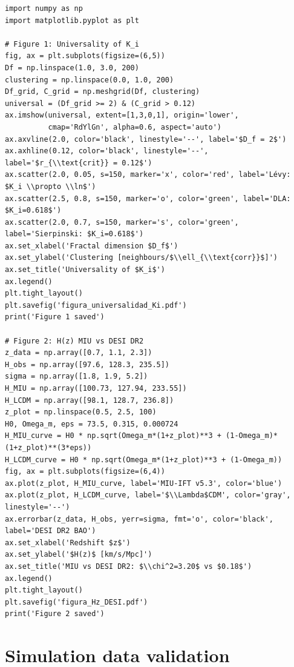 \documentclass[12pt, a4paper]{article}
\theoremstyle{miuThm}
\theoremstyle{remark}
\begin{document}
\begin{verbatim}
import numpy as np
import matplotlib.pyplot as plt

# Figure 1: Universality of K_i
fig, ax = plt.subplots(figsize=(6,5))
Df = np.linspace(1.0, 3.0, 200)
clustering = np.linspace(0.0, 1.0, 200)
Df_grid, C_grid = np.meshgrid(Df, clustering)
universal = (Df_grid >= 2) & (C_grid > 0.12)
ax.imshow(universal, extent=[1,3,0,1], origin='lower',
          cmap='RdYlGn', alpha=0.6, aspect='auto')
ax.axvline(2.0, color='black', linestyle='--', label='$D_f = 2$')
ax.axhline(0.12, color='black', linestyle='--', label='$r_{\\text{crit}} = 0.12$')
ax.scatter(2.0, 0.05, s=150, marker='x', color='red', label='Lévy: $K_i \\propto \\ln$')
ax.scatter(2.5, 0.8, s=150, marker='o', color='green', label='DLA: $K_i=0.618$')
ax.scatter(2.0, 0.7, s=150, marker='s', color='green', label='Sierpinski: $K_i=0.618$')
ax.set_xlabel('Fractal dimension $D_f$')
ax.set_ylabel('Clustering [neighbours/$\\ell_{\\text{corr}}$]')
ax.set_title('Universality of $K_i$')
ax.legend()
plt.tight_layout()
plt.savefig('figura_universalidad_Ki.pdf')
print('Figure 1 saved')

# Figure 2: H(z) MIU vs DESI DR2
z_data = np.array([0.7, 1.1, 2.3])
H_obs = np.array([97.6, 128.3, 235.5])
sigma = np.array([1.8, 1.9, 5.2])
H_MIU = np.array([100.73, 127.94, 233.55])
H_LCDM = np.array([98.1, 128.7, 236.8])
z_plot = np.linspace(0.5, 2.5, 100)
H0, Omega_m, eps = 73.5, 0.315, 0.000724
H_MIU_curve = H0 * np.sqrt(Omega_m*(1+z_plot)**3 + (1-Omega_m)*(1+z_plot)**(3*eps))
H_LCDM_curve = H0 * np.sqrt(Omega_m*(1+z_plot)**3 + (1-Omega_m))
fig, ax = plt.subplots(figsize=(6,4))
ax.plot(z_plot, H_MIU_curve, label='MIU-IFT v5.3', color='blue')
ax.plot(z_plot, H_LCDM_curve, label='$\\Lambda$CDM', color='gray', linestyle='--')
ax.errorbar(z_data, H_obs, yerr=sigma, fmt='o', color='black', label='DESI DR2 BAO')
ax.set_xlabel('Redshift $z$')
ax.set_ylabel('$H(z)$ [km/s/Mpc]')
ax.set_title('MIU vs DESI DR2: $\\chi^2=3.20$ vs $0.18$')
ax.legend()
plt.tight_layout()
plt.savefig('figura_Hz_DESI.pdf')
print('Figure 2 saved')
\end{verbatim}

\clearpage
\section{Simulation data validation}
\end{document}
